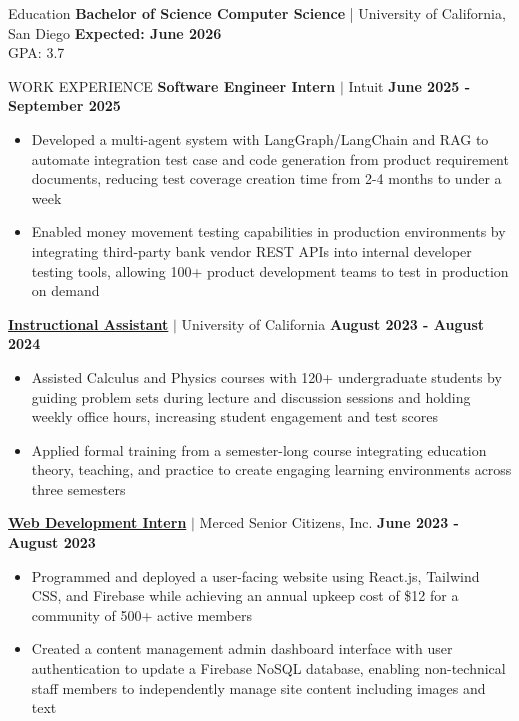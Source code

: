 \documentclass{resume}
\begin{document}
\begin{rSection}{Education}
{\bf Bachelor of Science Computer Science} | University of California, San Diego \hfill \textbf{Expected: June 2026} \\ \phantom{} \hfill GPA: 3.7
\end{rSection}
\vspace*{-4mm}
\begin{rSection}{WORK EXPERIENCE}
    {\textbf{Software Engineer Intern}} $|$ Intuit \hfill \textbf{June 2025 - September 2025}
    \vspace{-4pt}
        \begin{itemize}
            \itemsep -3pt {} 
                \item Developed a multi-agent system with LangGraph/LangChain and RAG to automate integration test case and code generation from product requirement documents, reducing test coverage creation time from 2-4 months to under a week
                \item Enabled money movement testing capabilities in production environments by integrating third-party bank vendor REST APIs into internal developer testing tools, allowing 100+ product development teams to test in production on demand
        \end{itemize}
    \href{https://hhmi-ie.ucmerced.edu/capacity-building-projects/learning-assistant-program}
    {\textbf{Instructional Assistant}} $|$ University of California \hfill \textbf{August 2023 - August 2024}
    \vspace{-4pt}
        \begin{itemize}
            \itemsep -3pt {} 
                \item Assisted Calculus and Physics courses with 120+ undergraduate students by guiding problem sets during lecture and discussion sessions and holding weekly office hours, increasing student engagement and test scores
                \item  Applied formal training from a semester-long course integrating education theory, teaching, and practice to create engaging learning environments across three semesters
        \end{itemize}
    \href{https://mercedseniors.org}{\textbf{Web Development Intern}} $|$ Merced Senior Citizens, Inc. \hfill \textbf{June 2023 - August 2023}
    \vspace{-4pt}
    \begin{itemize}
        \itemsep -3pt {} 
            \item Programmed and deployed a user-facing website using React.js, Tailwind CSS, and Firebase while achieving an annual upkeep cost of \$12 for a community of 500+ active members
            \item Created a content management admin dashboard interface with user authentication to update a Firebase NoSQL database, enabling non-technical staff members to independently manage site content including images and text
    \end{itemize}
\end{rSection}
\end{document}
